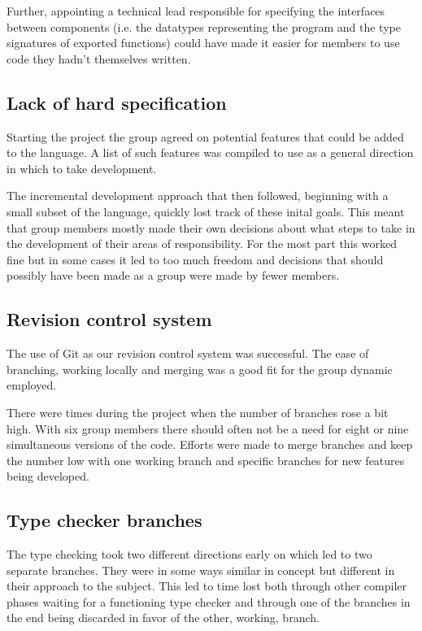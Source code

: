 Further, appointing a technical lead responsible for specifying the interfaces between components (i.e. the datatypes representing the program and the type signatures of exported functions) could have made it easier for members to use code they hadn’t themselves written.

\subsection{Lack of hard specification}

Starting the project the group agreed on potential features that could be added to the language. A list of such features was compiled to use as a general direction in which to take development. 

The incremental development approach that then followed, beginning with a small subset of the language, quickly lost track of these inital goals. This meant that group members mostly made their own decisions about what steps to take in the development of their areas of responsibility. For the most part this worked fine but in some cases it led to too much freedom and decisions that should possibly have been made as a group were made by fewer members.

\subsection{Revision control system}

The use of Git as our revision control system was successful. The ease of branching, working locally and merging was a good fit for the group dynamic employed. 

There were times during the project when the number of branches rose a bit high. With six group members there should often not be a need for eight or nine simultaneous versions of the code. Efforts were made to merge branches and keep the number low with one working branch and specific branches for new features being developed.

\subsection{Type checker branches}

The type checking took two different directions early on which led to two separate branches. They were in some ways similar in concept but different in their approach to the subject. This led to time lost both through other compiler phases waiting for a functioning type checker and through one of the branches in the end being discarded in favor of the other, working, branch. 

